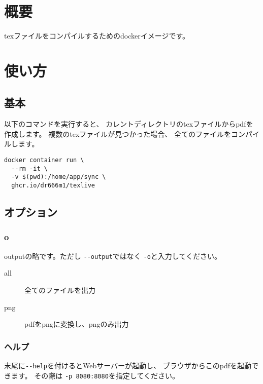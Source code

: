 \documentclass{jlreq}
\begin{document}
\section{概要}
texファイルをコンパイルするためのdockerイメージです。

\section{使い方}
\subsection{基本}
以下のコマンドを実行すると、
カレントディレクトリのtexファイルからpdfを作成します。
複数のtexファイルが見つかった場合、
全てのファイルをコンパイルします。

\begin{tcolorbox}[breakable]
\setlength{\baselineskip}{12pt}
\begin{verbatim}
docker container run \
  --rm -it \
  -v $(pwd):/home/app/sync \
  ghcr.io/dr666m1/texlive
\end{verbatim}

\end{tcolorbox}

\subsection{オプション}
\subsubsection{o}
outputの略です。ただし
\verb|--output|ではなく
\verb|-o|と入力してください。

\begin{description}
  \item[all] 全てのファイルを出力
  \item[png] pdfをpngに変換し、pngのみ出力
\end{description}

\subsubsection{ヘルプ}
末尾に\verb|--help|を付けるとWebサーバーが起動し、
ブラウザからこのpdfを起動できます。
その際は
\verb|-p 8080:8080|を指定してください。
\end{document}
